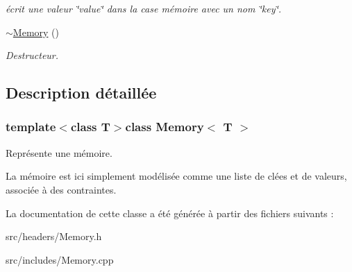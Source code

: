 \begin{DoxyCompactItemize}
\begin{DoxyCompactList}\small\item\em écrit une valeur \char`\"{}value\char`\"{} dans la case mémoire avec un nom \char`\"{}key\char`\"{}. \end{DoxyCompactList}\item 
\hypertarget{classMemory_a2d153fdede89954dc0875ab6c8d804c3}{\hyperlink{classMemory_a2d153fdede89954dc0875ab6c8d804c3}{$\sim$\-Memory} ()}\label{classMemory_a2d153fdede89954dc0875ab6c8d804c3}

\begin{DoxyCompactList}\small\item\em Destructeur. \end{DoxyCompactList}\end{DoxyCompactItemize}


\subsection{Description détaillée}
\subsubsection*{template$<$class T$>$class Memory$<$ T $>$}

Représente une mémoire. 

La mémoire est ici simplement modélisée comme une liste de clées et de valeurs, associée à des contraintes. 

La documentation de cette classe a été générée à partir des fichiers suivants \-:\begin{DoxyCompactItemize}
\item 
src/headers/Memory.\-h\item 
src/includes/Memory.\-cpp\end{DoxyCompactItemize}
